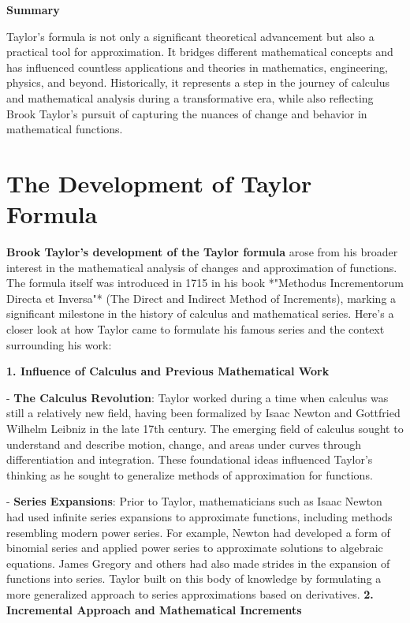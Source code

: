 \documentclass[a4paper,12pt]{book}
\begin{document}
\textbf{Summary}

Taylor’s formula is not only a significant theoretical advancement but also a practical tool for approximation. It bridges different mathematical concepts and has influenced countless applications and theories in mathematics, engineering, physics, and beyond. Historically, it represents a step in the journey of calculus and mathematical analysis during a transformative era, while also reflecting Brook Taylor's pursuit of capturing the nuances of change and behavior in mathematical functions.

\section{The Development of Taylor Formula}

\textbf{Brook Taylor’s development of the Taylor formula} arose from his broader interest in the mathematical analysis of changes and approximation of functions. The formula itself was introduced in 1715 in his book *"Methodus Incrementorum Directa et Inversa"* (The Direct and Indirect Method of Increments), marking a significant milestone in the history of calculus and mathematical series. Here’s a closer look at how Taylor came to formulate his famous series and the context surrounding his work:

\textbf{1. Influence of Calculus and Previous Mathematical Work}

- \textbf{The Calculus Revolution}: Taylor worked during a time when calculus was still a relatively new field, having been formalized by Isaac Newton and Gottfried Wilhelm Leibniz in the late 17th century. The emerging field of calculus sought to understand and describe motion, change, and areas under curves through differentiation and integration. These foundational ideas influenced Taylor’s thinking as he sought to generalize methods of approximation for functions.

- \textbf{Series Expansions}: Prior to Taylor, mathematicians such as Isaac Newton had used infinite series expansions to approximate functions, including methods resembling modern power series. For example, Newton had developed a form of binomial series and applied power series to approximate solutions to algebraic equations. James Gregory and others had also made strides in the expansion of functions into series. Taylor built on this body of knowledge by formulating a more generalized approach to series approximations based on derivatives.
\textbf{2. Incremental Approach and Mathematical Increments}
\end{document}
